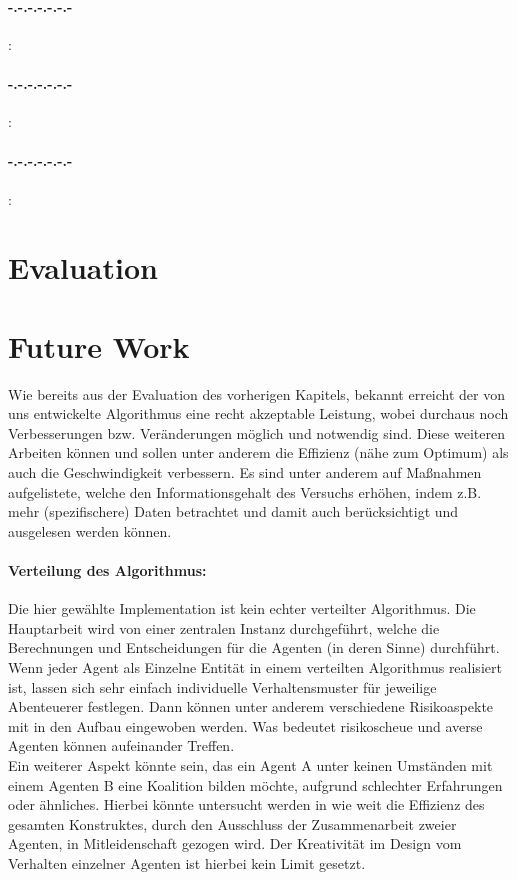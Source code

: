 \documentclass[fleqn,10pt]{SelfArx} %
\begin{document}
\paragraph{-.-.-.-.-.-.-}:

\paragraph{-.-.-.-.-.-.-}:

\paragraph{-.-.-.-.-.-.-}:

\section{Evaluation}
\label{sec:Evaluation}

\section{Future Work}
\label{sec:Future}

Wie bereits aus der Evaluation des vorherigen Kapitels, bekannt erreicht der von uns entwickelte Algorithmus eine recht akzeptable Leistung, wobei durchaus noch Verbesserungen bzw. Veränderungen möglich und notwendig sind. Diese weiteren Arbeiten können und sollen unter anderem die Effizienz (nähe zum Optimum) als auch die Geschwindigkeit verbessern. Es sind unter anderem auf Maßnahmen aufgelistete, welche den Informationsgehalt des Versuchs erhöhen, indem z.B. mehr (spezifischere) Daten betrachtet und damit auch berücksichtigt und ausgelesen werden können.

\paragraph{Verteilung des Algorithmus:}
Die hier gewählte Implementation ist kein echter verteilter Algorithmus. Die Hauptarbeit wird von einer zentralen Instanz durchgeführt, welche die Berechnungen und Entscheidungen für die Agenten (in deren Sinne) durchführt. Wenn jeder Agent als Einzelne Entität in einem verteilten Algorithmus realisiert ist, lassen sich sehr einfach individuelle Verhaltensmuster für jeweilige Abenteuerer festlegen. Dann können unter anderem verschiedene Risikoaspekte mit in den Aufbau eingewoben werden. Was bedeutet risikoscheue und averse Agenten können aufeinander Treffen. \\
Ein weiterer Aspekt könnte sein, das ein Agent A unter keinen Umständen mit einem Agenten B	eine Koalition bilden möchte, aufgrund schlechter Erfahrungen oder ähnliches. Hierbei könnte untersucht werden in wie weit die Effizienz des gesamten Konstruktes, durch den Ausschluss der Zusammenarbeit zweier Agenten, in Mitleidenschaft gezogen wird. Der Kreativität im Design vom Verhalten einzelner Agenten ist hierbei kein Limit gesetzt.
\end{document}
